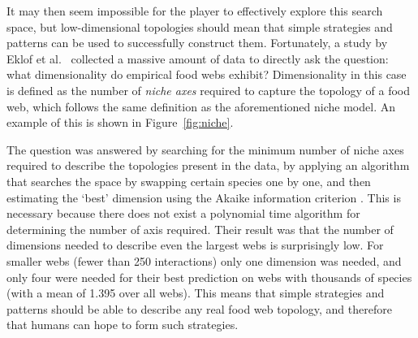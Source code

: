 It may then seem impossible for the player to effectively explore this search space, but low-dimensional topologies should mean that simple strategies and patterns can be used to successfully construct them.
Fortunately, a study by Eklof et al.\ \cite{Eklof2013} collected a massive amount of data to directly ask the question: what dimensionality do empirical food webs exhibit? Dimensionality in this case is defined as the number of \emph{niche axes} required to capture the topology of a food web, which follows the same definition as the aforementioned niche model. An example of this is shown in Figure~\ref{fig:niche}.

The question was answered by searching for the minimum number of niche axes required to describe the topologies present in the data, by applying an algorithm that searches the space by swapping certain species one by one, and then estimating the `best' dimension using the Akaike information criterion \cite{Eklof2013}. This is necessary because there does not exist a polynomial time algorithm for determining the number of axis required.
Their result was that the number of dimensions needed to describe even the largest webs is surprisingly low. For smaller webs (fewer than 250 interactions) only one dimension was needed, and only four were needed for their best prediction on webs with thousands of species (with a mean of 1.395 over all webs).
This means that simple strategies and patterns should be able to describe any real food web topology, and therefore that humans can hope to form such strategies.

